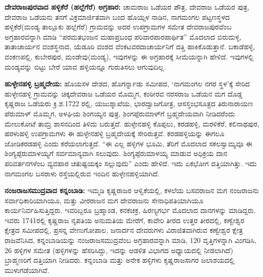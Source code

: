 \textbf{ದೇವರಾಜಪುರವಾದ ಹಳ್ಳಿಕೆರೆ (ಹಲ್ಲೆಗೆರೆ) ಅಗ್ರಹಾರ:} ಚಾಮರಾಜ ಒಡೆಯರ ಪೌತ್ರ, ದೇವರಾಜ ಒಡೆಯರ ಪುತ್ರ, ದೇವರಾಜ ಒಡೆಯನು ತನಗೆ ವಿಕ್ರಮಾರ್ಜಿತವಾಗಿ ಬಂದ ಹೊಯ್ಸಳ ನಾಡಿನ, ನಾಗಮಂಗಲ ಪಟ್ಟಣಸ್ಥಳದ ಹಳ್ಳಿಕೆರೆ(ಮಂಡ್ಯ ತಾಲ್ಲೂಕು ಹಲ್ಲೆಗೆರೆ) ಗ್ರಾಮವನ್ನು ಅದರ ಉಪಗ್ರಾಮಗಳ ಸಮೇತ ದೇವರಾಜಪುರವೆಂಬ ಅಗ್ರಹಾರವನ್ನಾಗಿ ಮಾಡಿ “ಪರಮತಭಂಜನ ಮಹಾಪ್ರಬಂಧ ಪರಿವಾರಪಾರಪಾರ್ಥಿತ” ಮೊದಲಾದ ಬಿರುದುಳ್ಳ, ತಾತಾಚಾರ್ಯನ ವಂಶಸ್ಥನಾದ, ಯೆಡೂರಿ ವಂಶದ ವೆಂಕಟವರದಾಚಾರ್ಯನಿಗೆ ದತ್ತಿ ಹಾಕಿಕೊಡುತ್ತಾನೆ. ಬಕಾಡೆಹಳ್ಳಿ, ವಂಕಣಪಲ್ಲಿ, ಕುಬೇರಪುರ, ಮಂಡೇವು(ಮಂಡ್ಯ), ಇವುಗಳನ್ನು ಈ ಅಗ್ರಹಾರಕ್ಕೆ ಸೀಮೆಯನ್ನಾಗಿ ಹೇಳಿದೆ. ಇವುಗಳಲ್ಲಿ ಮಂಡ್ಯವನ್ನು ಬಿಟ್ಟು ಬೇರೆ ಯಾವ ಹಳ್ಳಿಯನ್ನೂ ಗುರುತಿಸಲು ಆಗುವುದಿಲ್ಲ.

\textbf{ಹುಳ್ಳೇನಹಳ್ಳಿ ಬ್ರಹ್ಮದೇಯ:} ಹೊಯಸಳ ದೇಶದ, ಹೊಗರ್ನ್ನಾಡು ಸಮೀಪದ, ‘ನಾಗಮಂಗಲ ನಗರ ಸ್ಥಳ’ಕ್ಕೆ ಸೇರಿದ ಹುಳ್ಳೇನಹಳ್ಳಿ ಗ್ರಾಮವನ್ನು ಚಿಕ್ಕದೇವರಾಜ ಒಡೆಯರ ಮೊಮ್ಮಗ, ಕಂಠೀರವ ನರಸರಾಜ ಒಡೆಯನ ಮಗ ದೊಡ್ಡ ಕೃಷ್ಣರಾಜ ಒಡೆಯರು ಕ್ರಿ.ಶ.1722 ರಲ್ಲಿ, ಯಜುಶ್ಶಾಖೆಯ, ಭಾರದ್ವಾಜಗೋತ್ರ, ಆಸಸ್ತಂಭಸೂತ್ರದ ತಿರುನಾರಾಯಣ ಪೆರುಮಾಳ್​ ಮೊಮ್ಮಗ, ಅಳಘಿಯ ಶಿಂಗಯ್ಯನ ಪುತ್ರ, ಶಿಂಗಪ್ಪೆರುಮಾಳ್​ಗೆ ಬ್ರಹ್ಮದೇಯವಾಗಿ ನೀಡಿದರೆಂದು ಮೇಲುಕೋಟೆ ತಾಮ್ರ ಶಾಸನದಿಂದ ತಿಳಿದು ಬರುತ್ತದೆ. ಹುಳ್ಳೇನಹಳ್ಳಿ ಕೊಪ್ಪಲು, ಕರಡಹಳ್ಳಿ, ಮರಳಿಕೆರೆ, ಕಲಿನಾಥಪುರ, ಹರಳುಹಳ್ಳಿ ಉಪಗ್ರಾಮಗಳು ಈ ಹುಳ್ಳೇನಹಳ್ಳಿ ಬ್ರಹ್ಮದೇಯಕ್ಕೆ ಸೇರಿರುತ್ತವೆ. ಕರಡಹಳ್ಳಿಯನ್ನು ಈಗಲೂ ಜೋಡಿಕರಡಹಳ್ಳಿ ಎಂದು ಕರೆಯಲಾಗುತ್ತದೆ. “ಈ ಎಲ್ಲ ಹಳ್ಳಿಗಳ ಭೂಮಿ, ತೆರಿಗೆ ಮೊದಲಾದ ಸಕಲಸ್ವಾಮ್ಯವೂ ಈ ಶಿಂಗ್ಯಪ್ಪೆರುಮಾಳಯ್ಯಗೆ ಸರ್ವಮಾನ್ಯವಾಗಿ ಸಲುವುದು. ಶಿಂಗ್ಯಪ್ಪೆರುಮಾಳಯ್ಯ ಮಾಡುವ ಅಧಿಕ್ರಯ ದಾನ ಪರಿವರ್ತನಗಳೆಂಬ ವ್ಯವಹಾರ ಚತುಷ್ಟಯಕ್ಕಂ ಸಲ್ಲುವುದು” ಎಂದು ಹೇಳಿದೆ. ಇದು ಏಕಭೋಗ ದತ್ತಿಯಾಗಿತ್ತು. ಇದು ನಾಗಮಂಗಲ ಬಸರಾಳು ರಸ್ತೆಯಲ್ಲಿರುವ ಇಂದಿನ ಹುಳ್ಳೇನಹಳ್ಳಿ\-ಯಾಗಿದೆ.

\newpage

\textbf{ನಂಜರಾಜಸಮುದ್ರವಾದ ಕನ್ನಂಬಾಡಿ:} ಇಮ್ಮಡಿ ಕೃಷ್ಣರಾಜರ ಆಳ್ವಿಕೆಯಲ್ಲಿ, ಕಳಲೆಯ ಬಸವರಾಜನ ಮಗ ನಂಜರಾಜನು ಸರ್ವಾಧಿಕಾರಿಯಾಗಿಯೂ, ಮತ್ತು ವೀರರಾಜನ ಮಗ ದೇವರಾಜನು ಸೇನಾಧಿಪತಿಯಾಗಿಯೂ ಕಾರ್ಯ\-ನಿರ್ವಹಿಸುತ್ತಿದ್ದರು. ಇವರಿಬ್ಬರೂ ಬ್ರಹ್ಮಾಂಡ, ಕನಕಚಕ್ರ, ಹಿರಣ್ಯಗರ್ಭ ಮೊದಲಾದ ದಾನಗಳನ್ನು ಮಾಡಿದ್ದರು. ಇವರು 1741ರಲ್ಲಿ ಕೃಷ್ಣರಾಜ ನೃಪತಿಯ ಅನುಮತಿಯ ಮೇರೆಗೆ, ಕಾವೇರಿ ತೀರದ ಉತ್ತರ ತೀರದಲ್ಲಿ, ಕಣ್ವೇಶ್ವರ ಕ್ಷೇತ್ರದ ಸಮೀಪದಲ್ಲಿ, ಪ್ರಸನ್ನ ವೇಣುಗೋಪಾಲ, ಜನಾರ್ದನ ದೇವರುಗಳು ವಿರಾಜಿತವಾಗಿರುವ ಕಣ್ವೇಶ್ವರ ಕ್ಷೇತ್ರ ರಾಜವೆನಿಸಿದ, ಕನ್ನಂಬಾಡಿಯನ್ನು ನಂಜರಾಜಸಮುದ್ರವೆಂಬ ಅಗ್ರಹಾರವನ್ನಾಗಿ ಮಾಡಿ, 120 ವೃತ್ತಿಗಳನ್ನಾಗಿ ವಿಂಗಡಿಸಿ, 26 ಹಳ್ಳಿಗಳ ಸಮೇತ (ಹಳ್ಳಿಗಳನ್ನು ಹೆಸರಿಸಿದ್ದು, ಇದನ್ನು ಆಡಳಿತ ವಿಭಾಗದ ಅಧ್ಯಾಯದಲ್ಲಿ ನೀಡಲಾಗಿದೆ) ಬ್ರಾಹ್ಮಣರಿಗೆ ದತ್ತಿಯಾಗಿ ನೀಡಿದರು. ಕನ್ನಂಬಾಡಿ ಮತ್ತು ಅನೇಕ ಹಳ್ಳಿಗಳು ಕೃಷ್ಣರಾಜಸಾಗರ ಜಲಾಶಯದಲ್ಲಿ ಮುಳುಗಡೆಯಾಗಿವೆ.

